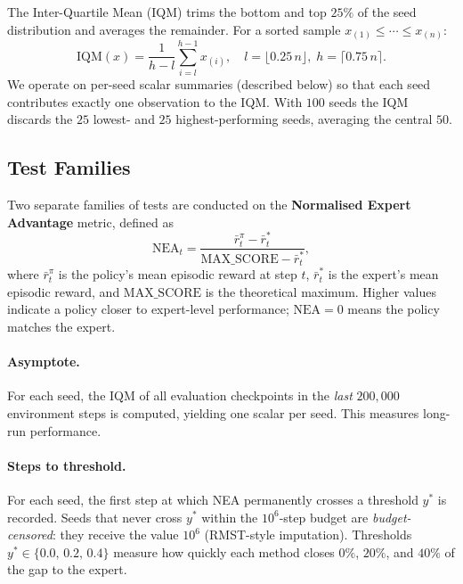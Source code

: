 The Inter-Quartile Mean (IQM) trims the bottom and top $25\%$ of the seed
distribution and averages the remainder.
For a sorted sample $x_{(1)} \le \cdots \le x_{(n)}$:
\begin{equation}
  \mathrm{IQM}(x) =
    \frac{1}{h - l}
    \sum_{i=l}^{h-1} x_{(i)},
  \quad
  l = \lfloor 0.25\,n \rfloor,\;
  h = \lceil  0.75\,n \rceil.
  \label{eq:iqm}
\end{equation}
We operate on per-seed scalar summaries (described below) so that each seed
contributes exactly one observation to the IQM.
With $100$ seeds the IQM discards the $25$ lowest- and $25$ highest-performing
seeds, averaging the central $50$.

\subsection*{Test Families}

Two separate families of tests are conducted on the
\textbf{Normalised Expert Advantage} metric, defined as
\begin{equation}
  \mathrm{NEA}_t =
    \frac{\bar{r}_t^{\pi} - \bar{r}_t^{*}}{\mathrm{MAX\_SCORE} - \bar{r}_t^{*}},
\end{equation}
where $\bar{r}_t^{\pi}$ is the policy's mean episodic reward at step $t$,
$\bar{r}_t^{*}$ is the expert's mean episodic reward, and
$\mathrm{MAX\_SCORE}$ is the theoretical maximum.
Higher values indicate a policy closer to expert-level performance; $\mathrm{NEA}=0$
means the policy matches the expert.

\paragraph{Asymptote.}
For each seed, the IQM of all evaluation checkpoints in the \emph{last}
$200{,}000$ environment steps is computed, yielding one scalar per seed.
This measures long-run performance.

\paragraph{Steps to threshold.}
For each seed, the first step at which NEA permanently crosses a
threshold $y^*$ is recorded.
Seeds that never cross $y^*$ within the $10^6$-step budget are
\emph{budget-censored}: they receive the value $10^6$ (RMST-style imputation).
Thresholds $y^* \in \{0.0,\, 0.2,\, 0.4\}$ measure how quickly each method
closes $0\%$, $20\%$, and $40\%$ of the gap to the expert.

